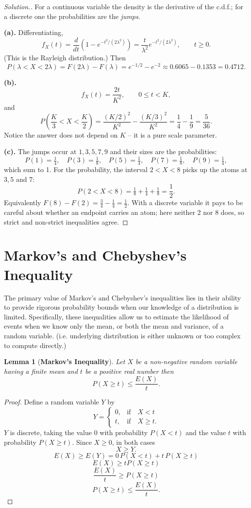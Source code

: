 \documentclass[12pt,a4paper]{report}
\theoremstyle{definition}
\theoremstyle{plain}
\newtheorem{lem}[thm]{Lemma}
\theoremstyle{definition}
\newenvironment{solution}
  {\renewcommand{\qedsymbol}{}\begin{proof}[\textit{Solution}.]}
  {\end{proof}}
\begin{document}
\begin{solution}
For a continuous variable the density is the derivative of the c.d.f.; for a discrete one
the probabilities are the \emph{jumps}.

\textbf{(a).} Differentiating,
\[f_X(t) = \frac{d}{dt}\left(1-e^{-t^{2}/(2\lambda^{2})}\right)
 = \frac{t}{\lambda^{2}}e^{-t^{2}/(2\lambda^{2})}, \qquad t\geq 0.\]
(This is the Rayleigh distribution.) Then
\[P(\lambda<X<2\lambda) = F(2\lambda)-F(\lambda)
 = e^{-1/2}-e^{-2} \approx 0.6065-0.1353 = 0.4712.\]

\textbf{(b).} \[f_X(t) = \frac{2t}{K^{2}}, \qquad 0\leq t<K,\]
and
\[P\left(\frac{K}{3}<X<\frac{K}{2}\right) = \frac{(K/2)^{2}}{K^{2}}-\frac{(K/3)^{2}}{K^{2}}
 = \frac{1}{4}-\frac{1}{9} = \frac{5}{36}.\]
Notice the answer does not depend on $K$ -- it is a pure scale parameter.

\textbf{(c).} The jumps occur at $1,3,5,7,9$ and their sizes are the probabilities:
\[P(1) = \tfrac14,\quad P(3) = \tfrac18,\quad P(5) = \tfrac14,\quad
P(7) = \tfrac18,\quad P(9) = \tfrac14,\]
which sum to 1. For the probability, the interval $2<X<8$ picks up the atoms at
$3, 5$ and $7$:
\[P(2<X<8) = \tfrac18+\tfrac14+\tfrac18 = \frac{1}{2}.\]
Equivalently $F(8)-F(2) = \tfrac34-\tfrac14 = \tfrac12$. With a discrete variable it pays
to be careful about whether an endpoint carries an atom; here neither 2 nor 8 does, so
strict and non-strict inequalities agree.
\end{solution}

\section{Markov's and Chebyshev's Inequality}
\vspace{-15pt}
The primary value of Markov’s and Chebyshev’s inequalities lies in their ability to provide rigorous probability bounds when our knowledge of a distribution is limited. Specifically, these inequalities allow us to estimate the likelihood of events when we know only the mean, or both the mean and variance, of a random variable. (i.e. underlying distribution is either unknown or too complex to compute directly.)


\begin{lem}[\textbf{Markov's Inequality}]
Let $X$ be a non-negative random variable having a finite mean and $t$ be a positive real number then \[P(X\geq t)\leq \frac{E(X)}{t}.\]
\end{lem}

\begin{proof}
Define a random variable $Y$ by
\[Y = \begin{cases}
0, &\text{if}\quad X<t\\
t, &\text{if}\quad X\geq t .
\end{cases}\]
$Y$ is discrete, taking the value $0$ with probability $P(X<t)$ and the value $t$ with
probability $P(X\geq t)$. Since $X\geq 0$, in both cases \[X \geq Y .\]
\[E(X)  \geq E(Y)=0\,P(X<t)+t\,P(X\geq t)\]
\[E(X) \geq tP(X\geq t)\] 
\[\frac{E(X)}{t}\geq P(X\geq t)\]
\[ P(X\geq t) \leq \frac{E(X)}{t}.\]
\end{proof}
\end{document}
